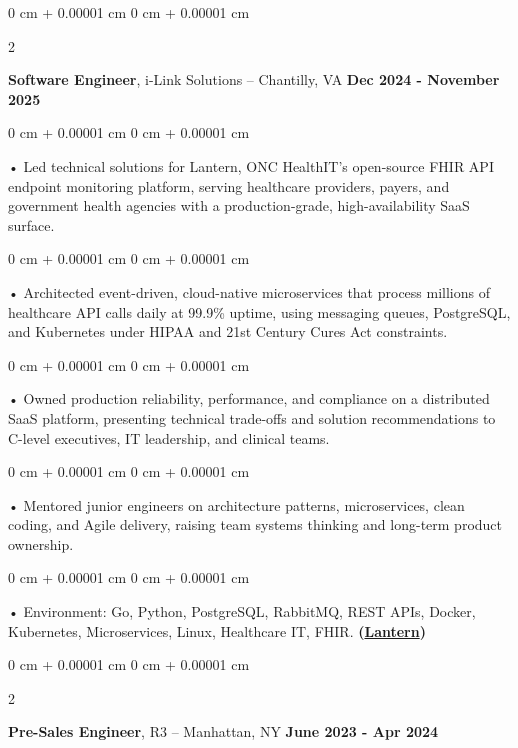 \documentclass[10pt, letterpaper]{article}
\newenvironment{onecolentry}{
    \begin{adjustwidth}{
        0 cm + 0.00001 cm
    }{
        0 cm + 0.00001 cm
    }
}{
    \end{adjustwidth}
} %
\newenvironment{twocolentry}[2][]{
    \onecolentry
    \def\secondColumn{#2}
    \setcolumnwidth{\fill, 4.5 cm}
    \begin{paracol}{2}
}{
    \switchcolumn \raggedleft \secondColumn
    \end{paracol}
    \endonecolentry
} %
\begin{document}
        \vspace{0.1cm}

        \begin{twocolentry}{
            \textbf{Dec 2024 - November 2025}
        }
            \textbf{Software Engineer}, i-Link Solutions -- Chantilly, VA\end{twocolentry}


        \begin{onecolentry}
             • Led technical solutions for Lantern, ONC HealthIT's open-source FHIR API endpoint monitoring platform, serving healthcare providers, payers, and government health agencies with a production-grade, high-availability SaaS surface.
        \end{onecolentry}
        \begin{onecolentry}
             • Architected event-driven, cloud-native microservices that process millions of healthcare API calls daily at 99.9\% uptime, using messaging queues, PostgreSQL, and Kubernetes under HIPAA and 21st Century Cures Act constraints.
        \end{onecolentry}
        \begin{onecolentry}
             • Owned production reliability, performance, and compliance on a distributed SaaS platform, presenting technical trade-offs and solution recommendations to C-level executives, IT leadership, and clinical teams.
        \end{onecolentry}
        \begin{onecolentry}
             • Mentored junior engineers on architecture patterns, microservices, clean coding, and Agile delivery, raising team systems thinking and long-term product ownership.
        \end{onecolentry}
        \begin{onecolentry}
             • Environment: Go, Python, PostgreSQL, RabbitMQ, REST APIs, Docker, Kubernetes, Microservices, Linux, Healthcare IT, FHIR. \textbf{(\href{https://lantern.healthit.gov/?tab=dashboard_tab}{Lantern})}
        \end{onecolentry}
        \vspace{0.1cm}

        \begin{twocolentry}{
            \textbf{June 2023 - Apr 2024}
        }
            \textbf{Pre-Sales Engineer}, R3 -- Manhattan, NY\end{twocolentry}
\end{document}
